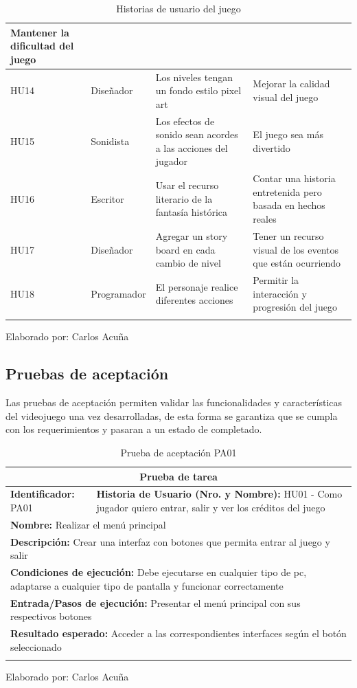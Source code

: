 \documentclass[a4paper, openright, 12pt]{report}
\begin{document}
\begin{longtable}{| l | l | p{5cm} | p{5cm} |}
Mantener la dificultad del juego \\ \hline
HU14 & Diseñador &
Los niveles tengan un fondo estilo pixel art &
Mejorar la calidad visual del juego \\ \hline 
HU15 & Sonidista &
Los efectos de sonido sean acordes a las acciones del jugador &
El juego sea más divertido \\ \hline
HU16 & Escritor &
Usar el recurso literario de la fantasía histórica &
Contar una historia entretenida pero basada en hechos reales \\ \hline
HU17 & Diseñador &
Agregar un story board en cada cambio de nivel &
Tener un recurso visual de los eventos que están ocurriendo \\ \hline
HU18 & Programador &
El personaje realice diferentes acciones  &
Permitir la interacción y progresión del juego \\ \hline
\caption{Historias de usuario del juego}
\end{longtable}
\begin{center}
Elaborado por: Carlos Acuña
\end{center}

\subsection*{Pruebas de aceptación}
\justify
Las pruebas de aceptación permiten validar las funcionalidades y características del videojuego una vez desarrolladas, de esta forma se garantiza que se cumpla con los requerimientos y pasaran a un estado de completado.

\begin{longtable}{| p{6cm} | p{6cm} |}
\hline
\multicolumn{2}{|c|}{\textbf{Prueba de tarea}} \\
\hline
\textbf{Identificador:} PA01 & \textbf{Historia de Usuario (Nro. y Nombre):} HU01 - Como jugador quiero entrar, salir y ver los créditos del juego \\
\hline
\multicolumn{2}{|p{12cm}|}{\textbf{Nombre:} Realizar el menú principal} \\ \hline
\multicolumn{2}{|p{12cm}|}{\textbf{Descripción:} Crear una interfaz con botones que permita entrar al juego y salir} \\ \hline
\multicolumn{2}{|p{12cm}|}{\textbf{Condiciones de ejecución:} Debe ejecutarse en cualquier tipo de pc, adaptarse a cualquier tipo de pantalla y funcionar correctamente} \\ \hline
\multicolumn{2}{|p{12cm}|}{\textbf{Entrada/Pasos de ejecución:} Presentar el menú principal con sus respectivos botones} \\ \hline
\multicolumn{2}{|p{12cm}|}{\textbf{Resultado esperado:} Acceder a las correspondientes interfaces según el botón seleccionado} \\ \hline
\caption{Prueba de aceptación PA01}
\end{longtable}
\begin{center}
Elaborado por: Carlos Acuña
\end{center}
\end{document}
